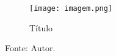 \begin{figure}
\hypertarget{id}{%
\centering
\texttt{[image: imagem.png]}
\caption{Título}\label{id}
}
\end{figure}

Fonte: Autor.
